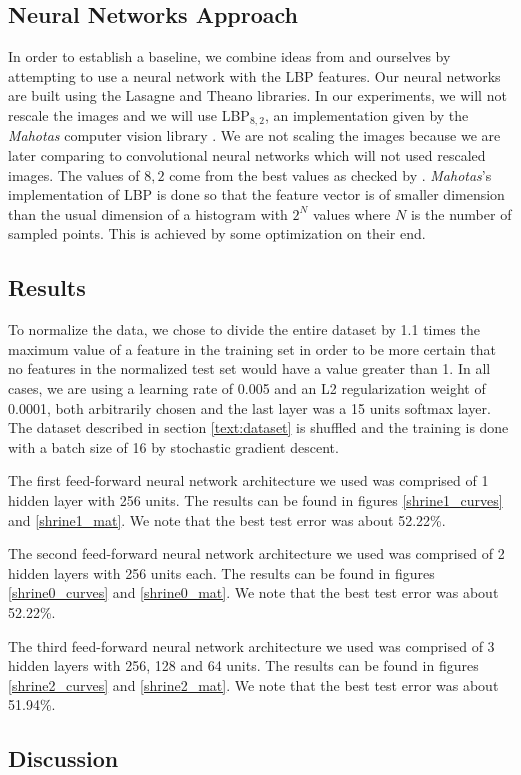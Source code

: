 \begin{multicols}{2}
\section{Neural Networks Approach}
In order to establish a baseline, we combine ideas from \citet{kylberg2011virus} and ourselves by attempting to use a neural network with the LBP features. Our neural networks are built using the Lasagne and Theano \cite{Bastien-Theano-2012, bergstra+al:2010-scipy} libraries. In our experiments, we will not rescale the images and we will use LBP$_{8,2}$, an implementation given by the \emph{Mahotas} computer vision library \citet{coelho2012mahotas}. We are not scaling the images because we are later comparing to convolutional neural networks which will not used rescaled images. The values of $8,2$ come from the best values as checked by \citet{kylberg2011virus}. \emph{Mahotas}'s implementation of LBP is done so that the feature vector is of smaller dimension than the usual dimension of a histogram with $2^N$ values where $N$ is the number of sampled points. This is achieved by some optimization on their end. 
\subsection{Results}
To normalize the data, we chose to divide the entire dataset by 1.1 times the maximum value of a feature in the training set in order to be more certain that no features in the normalized test set would have a value greater than 1. In all cases, we are using a learning rate of 0.005 and an L2 regularization weight of 0.0001, both arbitrarily chosen and the last layer was a 15 units softmax layer. The dataset described in section \ref{text:dataset} is shuffled and the training is done with a batch size of 16 by stochastic gradient descent. 

\par The first feed-forward neural network architecture we used was comprised of 1 hidden layer with 256 units. The results can be found in figures \ref{shrine1_curves} and \ref{shrine1_mat}. We note that the best test error was about 52.22\%. 


\par The second feed-forward neural network architecture we used was comprised of 2 hidden layers with 256 units each. The results can be found in figures \ref{shrine0_curves} and \ref{shrine0_mat}. We note that the best test error was about 52.22\%. 


\par The third feed-forward neural network architecture we used was comprised of 3 hidden layers with 256, 128 and 64 units. The results can be found in figures \ref{shrine2_curves} and \ref{shrine2_mat}. We note that the best test error was about 51.94\%. 


\subsection{Discussion}

\newpage


\end{multicols}

